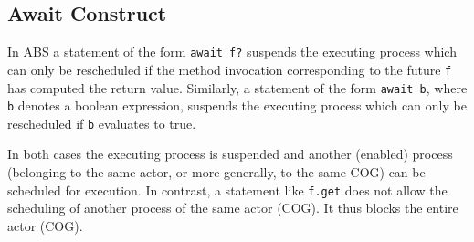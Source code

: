 \subsection{Await Construct}
In ABS  a statement  of the form \lstinline|await f?|
suspends the executing process which can only be rescheduled if the method
invocation corresponding to the future \lstinline|f| has computed the return value.
Similarly,   a statement  of the form \lstinline|await b|, where \lstinline|b|  denotes a boolean expression,  suspends the executing process which can only be rescheduled if  \lstinline|b| evaluates to true.
%
%	
%	
%

In both cases  the executing process is suspended and another (enabled) process (belonging to the same actor, or more generally, to the same COG)  can be scheduled for execution.
In contrast,  a statement like \lstinline|f.get| does not allow the scheduling of
another process of the same actor (COG). It thus blocks the entire actor (COG).

